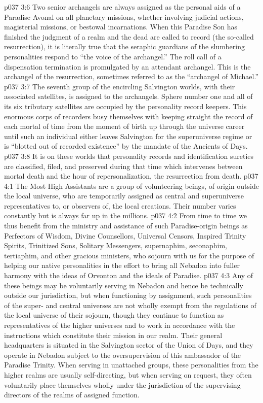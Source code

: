 \vs p037 3:6 Two senior archangels are always assigned as the personal aids of a Paradise Avonal on all planetary missions, whether involving judicial actions, magisterial missions, or bestowal incarnations. When this Paradise Son has finished the judgment of a realm and the dead are called to record (the so\hyp{}called resurrection), it is literally true that the seraphic guardians of the slumbering personalities respond to “the voice of the archangel.” The roll call of a dispensation termination is promulgated by an attendant archangel. This is the archangel of the resurrection, sometimes referred to as the “archangel of Michael.”
\vs p037 3:7 \pc {} The seventh group of the encircling Salvington worlds, with their associated satellites, is assigned to the archangels. Sphere number one and all of its six tributary satellites are occupied by the personality record keepers. This enormous corps of recorders busy themselves with keeping straight the record of each mortal of time from the moment of birth up through the universe career until such an individual either leaves Salvington for the superuniverse regime or is “blotted out of recorded existence” by the mandate of the Ancients of Days.
\vs p037 3:8 It is on these worlds that personality records and identification sureties are classified, filed, and preserved during that time which intervenes between mortal death and the hour of repersonalization, the resurrection from death.
\vs p037 4:1 The Most High Assistants are a group of volunteering beings, of origin outside the local universe, who are temporarily assigned as central and superuniverse representatives to, or observers of, the local creations. Their number varies constantly but is always far up in the millions.
\vs p037 4:2 From time to time we thus benefit from the ministry and assistance of such Paradise\hyp{}origin beings as Perfectors of Wisdom, Divine Counsellors, Universal Censors, Inspired Trinity Spirits, Trinitized Sons, Solitary Messengers, supernaphim, seconaphim, tertiaphim, and other gracious ministers, who sojourn with us for the purpose of helping our native personalities in the effort to bring all Nebadon into fuller harmony with the ideas of Orvonton and the ideals of Paradise.
\vs p037 4:3 Any of these beings may be voluntarily serving in Nebadon and hence be technically outside our jurisdiction, but when functioning by assignment, such personalities of the super\hyp{} and central universes are not wholly exempt from the regulations of the local universe of their sojourn, though they continue to function as representatives of the higher universes and to work in accordance with the instructions which constitute their mission in our realm. Their general headquarters is situated in the Salvington sector of the Union of Days, and they operate in Nebadon subject to the oversupervision of this ambassador of the Paradise Trinity. When serving in unattached groups, these personalities from the higher realms are usually self\hyp{}directing, but when serving on request, they often voluntarily place themselves wholly under the jurisdiction of the supervising directors of the realms of assigned function.
